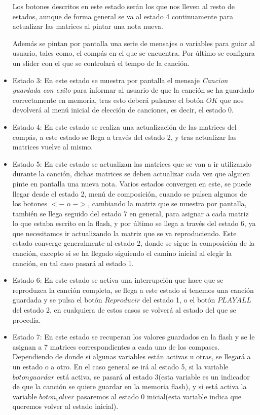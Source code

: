 \documentclass[12pt,a4paper]{article}
\begin{document}
\begin{itemize}
Los botones descritos en este estado serán los que nos lleven al resto de estados, aunque de forma general se va al estado 4 continuamente para actualizar las matrices al pintar una nota nueva.

Además se pintan por pantalla una serie de mensajes o variables para guiar al usuario, tales como, el compás en el que se encuentra. Por último se configura un slider con el que se controlará el tempo de la canción.


\item Estado 3: En este estado se muestra por pantalla el mensaje \textit{Cancion guardada con exito} para informar al usuario de que la canción se ha guardado correctamente en memoria, tras esto deberá pulsarse el botón $OK$ que nos devolverá al menú inicial de elección de canciones, es decir, el estado 0.

\item Estado 4: En este estado se realiza una actualización de las matrices del compás, a este estado se llega a través del estado 2, y tras actualizar las matrices vuelve al mismo.

\item Estado 5: En este estado se actualizan las matrices que se van a ir utilizando durante la canción, dichas matrices se deben actualizar cada vez que alguien pinte en pantalla una nueva nota. Varios estados convergen en este, se puede llegar desde el estado 2, menú de composición, cuando se pulsen algunos de los botones $<-$ o $->$, cambiando la matriz que se muestra por pantalla, también se llega seguido del estado 7 en general, para asignar a cada matriz lo que estaba escrito en la flash, y por último se llega a través del estado 6, ya que necesitamos ir actualizando la matriz que se va reproduciendo. Este estado converge generalmente al estado 2, donde se sigue la composición de la canción, excepto si se ha llegado siguiendo el camino inicial al elegir la canción, en tal caso pasará al estado 1.

\item Estado 6: En este estado se activa una interrupción que hace que se reproduzca la canción completa, se llega a este estado si tenemos una canción guardada y se pulsa el botón $Reproducir$ del estado 1, o el botón $PLAYALL$ del estado 2, en cualquiera de estos casos se volverá al estado del que se procedía.

\item Estado 7: En este estado se recuperan los valores guardados en la flash y se le asignan a 7 matrices correspondientes a cada uno de los compases. Dependiendo de donde si algunas variables están activas u otras, se llegará a un estado o a otro. En el caso general se irá al estado 5, si la variable $botonguardar$ está activa, se pasará al estado 3(esta variable es un indicador de que la canción se quiere guardar en la memoria flash), y si está activa la variable $boton_volver$ pasaremos al estado 0 inicial(esta variable indica que queremos volver al estado inicial).


\end{itemize}
\end{document}
